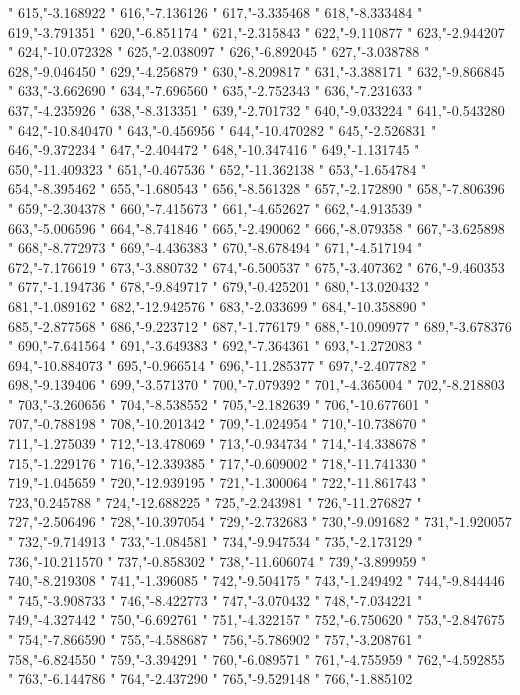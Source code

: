 "
615,"-3.168922
"
616,"-7.136126
"
617,"-3.335468
"
618,"-8.333484
"
619,"-3.791351
"
620,"-6.851174
"
621,"-2.315843
"
622,"-9.110877
"
623,"-2.944207
"
624,"-10.072328
"
625,"-2.038097
"
626,"-6.892045
"
627,"-3.038788
"
628,"-9.046450
"
629,"-4.256879
"
630,"-8.209817
"
631,"-3.388171
"
632,"-9.866845
"
633,"-3.662690
"
634,"-7.696560
"
635,"-2.752343
"
636,"-7.231633
"
637,"-4.235926
"
638,"-8.313351
"
639,"-2.701732
"
640,"-9.033224
"
641,"-0.543280
"
642,"-10.840470
"
643,"-0.456956
"
644,"-10.470282
"
645,"-2.526831
"
646,"-9.372234
"
647,"-2.404472
"
648,"-10.347416
"
649,"-1.131745
"
650,"-11.409323
"
651,"-0.467536
"
652,"-11.362138
"
653,"-1.654784
"
654,"-8.395462
"
655,"-1.680543
"
656,"-8.561328
"
657,"-2.172890
"
658,"-7.806396
"
659,"-2.304378
"
660,"-7.415673
"
661,"-4.652627
"
662,"-4.913539
"
663,"-5.006596
"
664,"-8.741846
"
665,"-2.490062
"
666,"-8.079358
"
667,"-3.625898
"
668,"-8.772973
"
669,"-4.436383
"
670,"-8.678494
"
671,"-4.517194
"
672,"-7.176619
"
673,"-3.880732
"
674,"-6.500537
"
675,"-3.407362
"
676,"-9.460353
"
677,"-1.194736
"
678,"-9.849717
"
679,"-0.425201
"
680,"-13.020432
"
681,"-1.089162
"
682,"-12.942576
"
683,"-2.033699
"
684,"-10.358890
"
685,"-2.877568
"
686,"-9.223712
"
687,"-1.776179
"
688,"-10.090977
"
689,"-3.678376
"
690,"-7.641564
"
691,"-3.649383
"
692,"-7.364361
"
693,"-1.272083
"
694,"-10.884073
"
695,"-0.966514
"
696,"-11.285377
"
697,"-2.407782
"
698,"-9.139406
"
699,"-3.571370
"
700,"-7.079392
"
701,"-4.365004
"
702,"-8.218803
"
703,"-3.260656
"
704,"-8.538552
"
705,"-2.182639
"
706,"-10.677601
"
707,"-0.788198
"
708,"-10.201342
"
709,"-1.024954
"
710,"-10.738670
"
711,"-1.275039
"
712,"-13.478069
"
713,"-0.934734
"
714,"-14.338678
"
715,"-1.229176
"
716,"-12.339385
"
717,"-0.609002
"
718,"-11.741330
"
719,"-1.045659
"
720,"-12.939195
"
721,"-1.300064
"
722,"-11.861743
"
723,"0.245788
"
724,"-12.688225
"
725,"-2.243981
"
726,"-11.276827
"
727,"-2.506496
"
728,"-10.397054
"
729,"-2.732683
"
730,"-9.091682
"
731,"-1.920057
"
732,"-9.714913
"
733,"-1.084581
"
734,"-9.947534
"
735,"-2.173129
"
736,"-10.211570
"
737,"-0.858302
"
738,"-11.606074
"
739,"-3.899959
"
740,"-8.219308
"
741,"-1.396085
"
742,"-9.504175
"
743,"-1.249492
"
744,"-9.844446
"
745,"-3.908733
"
746,"-8.422773
"
747,"-3.070432
"
748,"-7.034221
"
749,"-4.327442
"
750,"-6.692761
"
751,"-4.322157
"
752,"-6.750620
"
753,"-2.847675
"
754,"-7.866590
"
755,"-4.588687
"
756,"-5.786902
"
757,"-3.208761
"
758,"-6.824550
"
759,"-3.394291
"
760,"-6.089571
"
761,"-4.755959
"
762,"-4.592855
"
763,"-6.144786
"
764,"-2.437290
"
765,"-9.529148
"
766,"-1.885102

